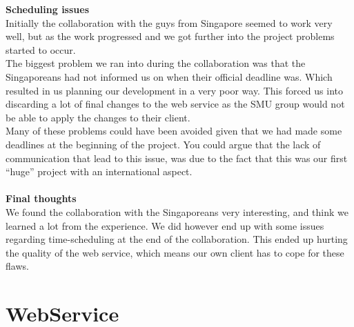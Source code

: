 \documentclass[10pt,a4paper]{article}
\begin{document}
{\bfseries Scheduling issues}\\
Initially the collaboration with the guys from Singapore seemed to work very well, but as the work progressed and we got further into the project problems started to occur. \\
The biggest problem we ran into during the collaboration was that the Singaporeans had not informed us on when their official deadline was. Which resulted in us planning our development in a very poor way. This forced us into discarding a lot of final changes to the web service as the SMU group would not be able to apply the changes to their client. \\
Many of these problems could have been avoided given that we had made some deadlines at the beginning of the project. You could argue that the lack of communication that lead to this issue, was due to the fact that this was our first “huge” project with an international aspect.\\\\
{\bfseries Final thoughts}\\
We found the collaboration with the Singaporeans very interesting, and think we learned a lot from the experience. We did however end up with some issues regarding time-scheduling at the end of the collaboration. This ended up hurting the quality of the web service, which means our own client has to cope for these flaws. 






\section{WebService}
\end{document}

